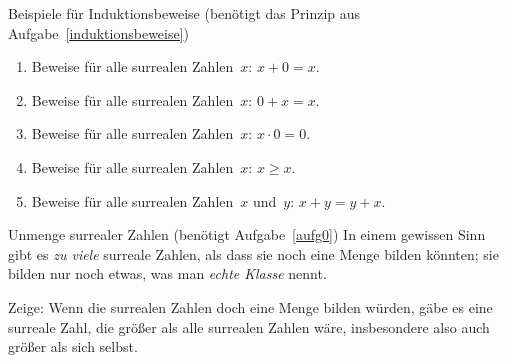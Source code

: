\documentclass{zirkelblatt}
\begin{document}
\begin{aufgabe}{Beispiele für Induktionsbeweise (benötigt
das Prinzip aus Aufgabe~\ref{induktionsbeweise})}
\label{induktionsbeispiele}
\begin{enumerate}
\item Beweise für alle surrealen Zahlen~$x$: $x + 0 = x$.
\item Beweise für alle surrealen Zahlen~$x$: $0 + x = x$.
\item Beweise für alle surrealen Zahlen~$x$: $x \cdot 0 = 0$.
\item Beweise für alle surrealen Zahlen~$x$: $x \geq x$.
\item Beweise für alle surrealen Zahlen~$x$ und~$y$: $x + y = y + x$.
\end{enumerate}
\end{aufgabe}

\begin{aufgabe}{Unmenge surrealer Zahlen (benötigt Aufgabe~\ref{aufg0})}
\label{unmenge}
In einem gewissen Sinn gibt es \emph{zu viele} surreale Zahlen, als dass sie
noch eine Menge bilden könnten; sie bilden nur noch etwas, was man \emph{echte
Klasse} nennt.

Zeige: Wenn die surrealen Zahlen doch eine Menge bilden würden, gäbe es eine
surreale Zahl, die größer als alle surrealen Zahlen wäre, insbesondere also auch
größer als sich selbst.
\end{aufgabe}
\end{document}
